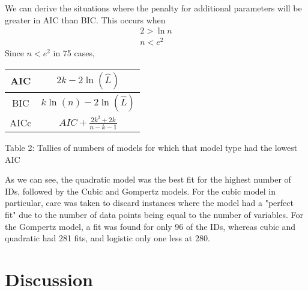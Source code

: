 \documentclass[11pt,a4wide,titlepage]{article}
\begin{document}
We can derive the situations where the penalty for additional parameters will be greater in AIC than BIC. This occurs when
\begin{gather}
2 > \ln{n}\\
n < e^2
\end{gather}
Since $n < e^2$ in 75 cases, 

\begin{center}
\def\arraystretch{1.5}
\begin{tabular}{|c|c|}
	\hline
	AIC & $2k - 2\ln(\hat{L})$\\
	\hline
	BIC & $k\ln(n) - 2\ln(\hat{L})$\\
	\hline
	AICc & $AIC + \frac{2k^2 + 2k}{n - k - 1}$\\
	\hline
\end{tabular}
\end{center}


\begin{center}
	Table 2: Tallies of numbers of models for which that model type had the lowest AIC\newline
\end{center}

As we can see, the quadratic model was the best fit for the highest number of IDs, followed by the Cubic and Gompertz models. For the cubic model in particular, care was taken to discard instances where the model had a "perfect fit" due to the number of data points being equal to the number of variables. For the Gompertz model, a fit was found for only 96 of the IDs, whereas cubic and quadratic had 281 fits, and logistic only one less at 280. 

\section*{Discussion}



\end{document}
